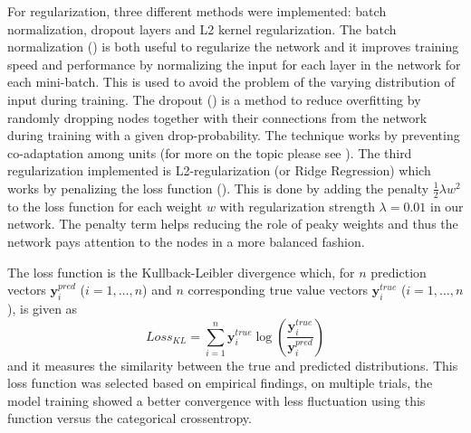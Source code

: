 \documentclass[11pt, a4paper]{article}
\begin{document}
For regularization, three different methods were implemented: batch normalization, dropout layers and L2 kernel regularization. The batch normalization (\cite{ioffe2015batch}) is both useful to regularize the network and it improves training speed and performance by normalizing the input for each layer in the network for each mini-batch. This is used to avoid the problem of the varying distribution of input during training. The dropout (\cite{srivastava2014dropout}) is a method to reduce overfitting by randomly dropping nodes together with their connections from the network during training with a given drop-probability. The technique works by preventing co-adaptation among units (for more on the topic please see \cite{hinton2012improving}). The third regularization implemented is L2-regularization (or Ridge Regression) which works by penalizing the loss function (\cite{ng2004feature}). This is done by adding the penalty $\frac{1}{2}\lambda w^2$ to the loss function for each weight $w$ with regularization strength $\lambda = 0.01$ in our network. The penalty term helps reducing the role of peaky weights and thus the network pays attention to the nodes in a more balanced fashion.

The loss function is the Kullback-Leibler divergence which, for $n$ prediction vectors $\mathbf{y}^{pred}_i$ ($i= 1, \dots, n$) and $n$ corresponding true value vectors $\mathbf{y}^{true}_i$ ($i= 1, \dots, n$), is given as
\begin{equation}
    \label{eq:KL}
    Loss_{KL} = \sum_{i=1}^{n}\mathbf{y}_i^{true} \log \left( \frac{\mathbf{y}_i^{true}}{\mathbf{y}_i^{pred}}\right)
\end{equation}
and it measures the similarity between the true and predicted distributions. This loss function was selected based on empirical findings, on multiple trials, the model training showed a better convergence with less fluctuation using this function versus the categorical crossentropy.
\end{document}
